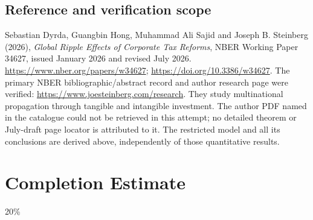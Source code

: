 \documentclass[11pt,a4paper]{article}
\begin{document}
\subsection*{Reference and verification scope}
Sebastian Dyrda, Guangbin Hong, Muhammad Ali Sajid and Joseph B. Steinberg (2026), \emph{Global Ripple Effects of Corporate Tax Reforms}, NBER Working Paper 34627, issued January 2026 and revised July 2026. \url{https://www.nber.org/papers/w34627}; \url{https://doi.org/10.3386/w34627}. The primary NBER bibliographic/abstract record and author research page were verified: \url{https://www.joesteinberg.com/research}. They study multinational propagation through tangible and intangible investment. The author PDF named in the catalogue could not be retrieved in this attempt; no detailed theorem or July-draft page locator is attributed to it. The restricted model and all its conclusions are derived above, independently of those quantitative results.

\section{Completion Estimate}
20\%
\end{document}
